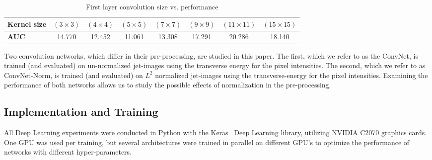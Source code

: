 \begin{table}[h!]
  \centering
  \begin{tabular}{l|c|c|c|c|c|c|c}
    \bfseries Kernel size &  $(3 \times 3)$ & $(4 \times 4)$ & $(5 \times 5)$ & $(7 \times 7)$ & $(9 \times 9)$  & $(11 \times 11)$ & $(15 \times 15)$ \\ 
    \hline
    \bfseries AUC & 14.770 & 12.452 & 11.061 & 13.308 & 17.291 & 20.286 & 18.140 
  \end{tabular}
  \caption{First layer convolution size vs. performance}
  \label{tab:kernelsize}
\end{table}

Two convolution networks, which differ in their pre-processing, are studied in this paper.  The first, which we refer to as the ConvNet, is trained (and evaluated) on un-normalized jet-images using the transverse energy for the pixel intensities.  The second, which we refer to as ConvNet-Norm, is trained (and evaluated) on $L^{2}$ normalized jet-images using the transverse-energy for the pixel intensities.  Examining the performance of both networks allows us to study the possible effects of normalization in the pre-processing.




\subsection{Implementation and Training} %
\label{ssub:implementation_and_training}

All Deep Learning experiments were conducted in Python with the Keras~\cite{Keras} Deep Learning library, utilizing NVIDIA C2070 graphics cards. One GPU was used per training, but several architectures were trained in parallel on different GPU's to optimize the performance of networks with different hyper-parameters.

